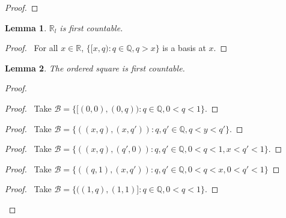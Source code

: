 \documentclass{report}
\let\qed\relax
\newtheorem{lm}{Lemma}[section]
\theoremstyle{definition}
\begin{document}
  \begin{proof}
    \pf
    \qed
  \end{proof}

  \begin{lm}
    $\mathbb{R}_l$ is first countable.
  \end{lm}

  \begin{proof}
    \pf\ For all $x \in \mathbb{R}$, $\{ [x, q) : q \in \mathbb{Q}, q > x \}$
    is a basis at $x$. \qed
  \end{proof}

  \begin{lm}
    The ordered square is first countable.
  \end{lm}

  \begin{proof}
    \pf
    \begin{proof}
      \pf\ Take $\mathcal{B} = \{ [(0, 0), (0, q)) : q \in \mathbb{Q}, 0 < q <
      1
      \}$.
    \end{proof}
    \begin{proof}
      \pf\ Take $\mathcal{B} = \{ ((x, q), (x, q')) : q, q' \in \mathbb{Q}, q <
      y < q' \}$.
    \end{proof}
    \begin{proof}
      \pf\ Take $\mathcal{B} = \{ ((x, q), (q', 0)) : q, q' \in \mathbb{Q}, 0 <
      q < 1, x < q' < 1 \}$.
    \end{proof}
    \begin{proof}
      \pf\ Take $\mathcal{B} = \{ ((q, 1), (x, q')) : q, q' \in \mathbb{Q}, 0 <
      q < x, 0 < q' < 1 \}$
    \end{proof}
    \begin{proof}
      \pf\ Take $\mathcal{B} = \{ ((1, q), (1, 1)] : q \in \mathbb{Q}, 0 < q <
      1
      \}$.
    \end{proof}
    \qed
  \end{proof}
\end{document}

